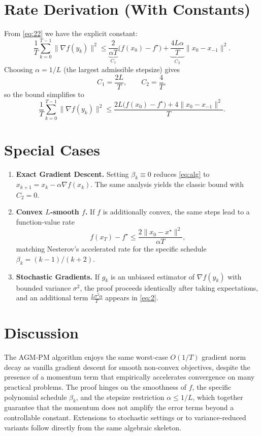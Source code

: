 \documentclass{article}
\begin{document}
\section*{Rate Derivation (With Constants)}
From \eqref{eq:22} we have the explicit constant:
\[
\frac{1}{T}\sum_{k=0}^{T-1}\|\nabla f(y_k)\|^{2}
\le \underbrace{\frac{2}{\alpha T}}_{\displaystyle C_1}
\bigl(f(x_0)-f^\star\bigr)
+\underbrace{\frac{4L\alpha}{T}}_{\displaystyle C_2}
\|x_0-x_{-1}\|^{2}.
\]
Choosing $\alpha = 1/L$ (the largest admissible stepsize) gives
\[
C_1 = \frac{2L}{T},\qquad C_2 = \frac{4}{T},
\]
so the bound simplifies to
\[
\frac{1}{T}\sum_{k=0}^{T-1}\|\nabla f(y_k)\|^{2}
\le \frac{2L\bigl(f(x_0)-f^\star\bigr)+4\|x_0-x_{-1}\|^{2}}{T}.
\]

\section*{Special Cases}
\begin{enumerate}[label={\arabic*.}]
\item \textbf{Exact Gradient Descent.} Setting $\beta_k\equiv0$ reduces \eqref{eq:alg} to $x_{k+1}=x_k-\alpha\nabla f(x_k)$. The same analysis yields the classic bound with $C_2=0$.
\item \textbf{Convex $L$‑smooth $f$.} If $f$ is additionally convex, the same steps lead to a function‑value rate
\[
f(x_T)-f^\star \le \frac{2\|x_0-x^\star\|^2}{\alpha T},
\]
matching Nesterov’s accelerated rate for the specific schedule $\beta_k=(k-1)/(k+2)$.
\item \textbf{Stochastic Gradients.} If $g_k$ is an unbiased estimator of $\nabla f(y_k)$ with bounded variance $\sigma^2$, the proof proceeds identically after taking expectations, and an additional term $\frac{L\sigma^2\alpha}{T}$ appears in \eqref{eq:2}.
\end{enumerate}

\section*{Discussion}
The AGM‑PM algorithm enjoys the same worst‑case $O(1/T)$ gradient norm decay as vanilla gradient descent for smooth non‑convex objectives, despite the presence of a momentum term that empirically accelerates convergence on many practical problems. The proof hinges on the smoothness of $f$, the specific polynomial schedule $\beta_k$, and the stepsize restriction $\alpha\le1/L$, which together guarantee that the momentum does not amplify the error terms beyond a controllable constant. Extensions to stochastic settings or to variance‑reduced variants follow directly from the same algebraic skeleton.
\end{document}
